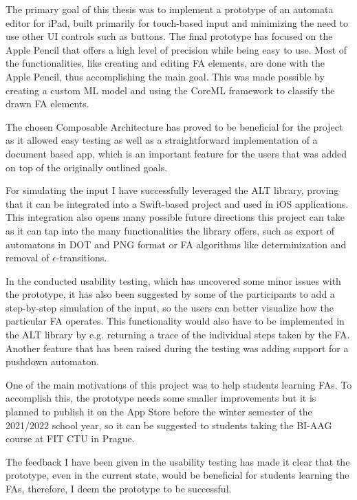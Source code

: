 The primary goal of this thesis was to implement a prototype of an automata editor for iPad, built primarily for touch-based input and minimizing the need to use other UI controls such as buttons. The final prototype has focused on the Apple Pencil that offers a high level of precision while being easy to use. Most of the functionalities, like creating and editing FA elements, are done with the Apple Pencil, thus accomplishing the main goal. This was made possible by creating a custom ML model and using the CoreML framework to classify the drawn FA elements.

The chosen Composable Architecture has proved to be beneficial for the project as it allowed easy testing as well as a straightforward implementation of a document based app, which is an important feature for the users that was added on top of the originally outlined goals.

For simulating the input I have successfully leveraged the ALT library, proving that it can be integrated into a Swift-based project and used in iOS applications. This integration also opens many possible future directions this project can take as it can tap into the many functionalities the library offers, such as export of automatons in DOT and PNG format or FA algorithms like determinization and removal of $\epsilon$-transitions.

In the conducted usability testing, which has uncovered some minor issues with the prototype, it has also been suggested by some of the participants to add a step-by-step simulation of the input, so the users can better visualize how the particular FA operates. This functionality would also have to be implemented in the ALT library by e.g. returning a trace of the individual steps taken by the FA. Another feature that has been raised during the testing was adding support for a pushdown automaton.

One of the main motivations of this project was to help students learning FAs. To accomplish this, the prototype needs some smaller improvements but it is planned to publish it on the App Store before the winter semester of the 2021/2022 school year, so it can be suggested to students taking the BI-AAG course at FIT CTU in Prague.

The feedback I have been given in the usability testing has made it clear that the prototype, even in the current state, would be beneficial for students learning the FAs, therefore, I deem the prototype to be successful.
